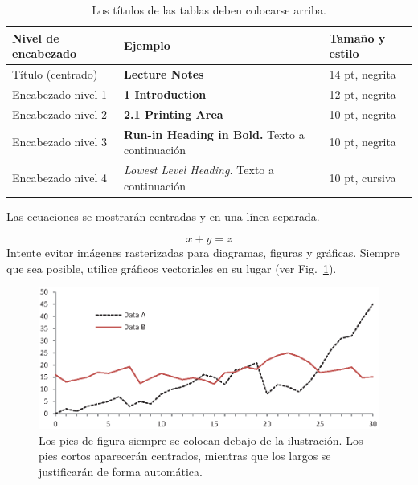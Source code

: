 \documentclass{sistedes}
\begin{document}
\begin{table}
\centering
\caption{Los títulos de las tablas deben colocarse arriba.}\label{tab1}
\begin{tabular}{|l|l|l|}
\hline
Nivel de encabezado & Ejemplo & Tamaño y estilo\\
\hline
Título (centrado) &  {\Large\bfseries Lecture Notes} & 14 pt, negrita\\
Encabezado nivel 1 &  {\large\bfseries 1 Introduction} & 12 pt, negrita\\
Encabezado nivel 2 & {\bfseries 2.1 Printing Area} & 10 pt, negrita\\
Encabezado nivel 3 & {\bfseries Run-in Heading in Bold.} Texto a continuación & 10 pt, negrita\\
Encabezado nivel 4 & {\itshape Lowest Level Heading.} Texto a continuación & 10 pt, cursiva\\
\hline
\end{tabular}
\end{table}


Las ecuaciones se mostrarán centradas y en una línea separada.

\begin{equation}
x + y = z
\end{equation}
Intente evitar imágenes rasterizadas para diagramas, figuras y gráficas. 
Siempre que sea posible, utilice gráficos vectoriales en su lugar
(ver Fig.~\ref{fig1}).

\begin{figure}
\includegraphics[width=\textwidth]{fig1.eps}
\caption{Los pies de figura siempre se colocan debajo de la ilustración.
Los pies cortos aparecerán centrados, mientras que los largos se justificarán 
de forma automática.}\label{fig1}
\end{figure}
\end{document}
